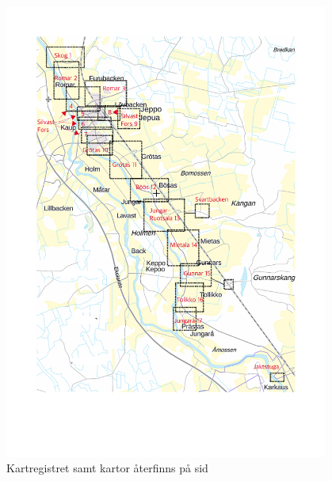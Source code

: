 \begin{figure}[h!]
  \centering
  \includegraphics[width=0.95\textwidth]{kartor/Kartregister.pdf}
  \caption{Kartregistret samt kartor återfinns på sid \pageref{map:registry}}
\end{figure}
